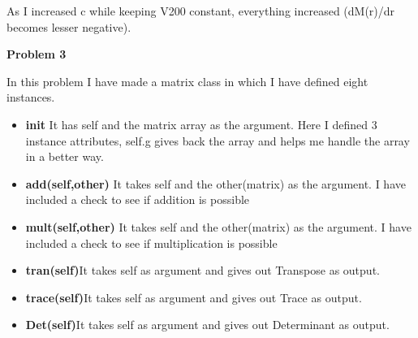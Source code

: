 \documentclass{article}
\begin{document}
As I increased c while keeping V200 constant, everything increased (dM(r)/dr becomes lesser negative).
\vspace{1.5em}

\textbf{Problem 3}\vspace{1.5em}

In this problem I have made a matrix class in which I have defined eight instances. \vspace{0.2em}

\begin{itemize}

\item{\textbf{init}}\vspace{0.2em} It has self and the matrix array as the argument. Here I defined 3 instance attributes, self.g gives back the array and helps me handle the array in a better way.
\item{\textbf{add(self,other)}}\vspace{0.2em} It takes self and the other(matrix) as the argument. I have included a check to see if addition is possible
\item{\textbf{mult(self,other)}}\vspace{0.2em} It takes self and the other(matrix) as the argument. I have included a check to see if multiplication is possible
\item{\textbf{tran(self)}}\vspace{0.2em}It takes self as argument and gives out Transpose as output.
\item{\textbf{trace(self)}}\vspace{0.2em}It takes self as argument and gives out Trace as output.
\item{\textbf{Det(self)}}\vspace{0.2em}It takes self as argument and gives out Determinant as output.


\end{itemize}
\end{document}
